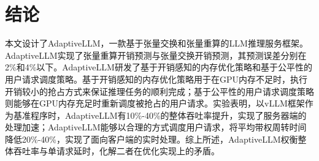 \section{结论}

本文设计了AdaptiveLLM，一款基于张量交换和张量重算的LLM推理服务框架。AdaptiveLLM实现了张量重算开销预测与张量交换开销预测，其预测误差分别在2\%和4\%以下。AdaptiveLLM研发了基于开销感知的内存优化策略和基于公平性的用户请求调度策略。基于开销感知的内存优化策略用于在GPU内存不足时，执行开销较小的抢占方式来保证推理任务的顺利完成；基于公平性的用户请求调度策略则能够在GPU内存充足时重新调度被抢占的用户请求。实验表明，以vLLM框架作为基准程序时，AdaptiveLLM有10\%-40\%的整体吞吐率提升，实现了服务器端的处理加速；AdaptiveLLM能够以合理的方式调度用户请求，将平均带权周转时间降低20\%-40\%，实现了面向客户端的实时处理。综上所述，AdaptiveLLM权衡整体吞吐率与单请求延时，化解二者在优化实现上的矛盾。